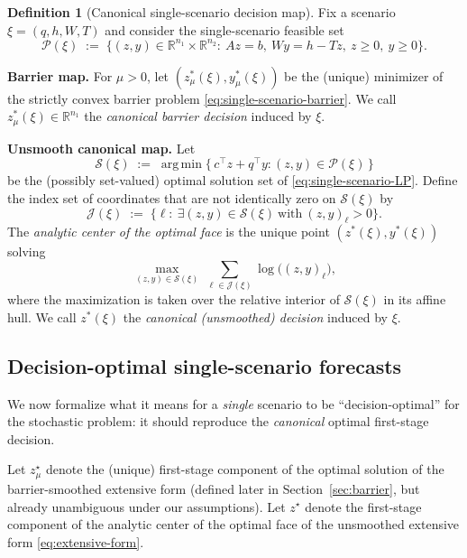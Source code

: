 \documentclass[11pt]{article}
\theoremstyle{plain}
\theoremstyle{definition}
\newtheorem{definition}[theorem]{Definition}
\theoremstyle{remark}
\newcommand{\R}{\mathbb{R}}
\newcommand{\argmin}{\operatorname*{arg\,min}}
\begin{document}
\begin{definition}[Canonical single-scenario decision map]\label{def:canonical-map}
Fix a scenario $\xi=(q,h,W,T)$ and consider the single-scenario feasible set
\[
  \mathcal P(\xi)\;:=\;\big\{(z,y)\in\R^{n_1}\times\R^{n_2}:\ Az=b,\ Wy=h-Tz,\ z\ge 0,\ y\ge 0\big\}.
\]

\smallskip
\noindent\textbf{Barrier map.}
For $\mu>0$, let $(z_\mu^*(\xi),y_\mu^*(\xi))$ be the (unique) minimizer of the strictly convex barrier problem
\eqref{eq:single-scenario-barrier}.  We call $z_\mu^*(\xi)\in\R^{n_1}$ the \emph{canonical barrier decision}
induced by $\xi$.

\smallskip
\noindent\textbf{Unsmooth canonical map.}
Let
\[
  \mathcal S(\xi)\;:=\;\argmin\big\{\, c^\top z + q^\top y : (z,y)\in\mathcal P(\xi)\,\big\}
\]
be the (possibly set-valued) optimal solution set of \eqref{eq:single-scenario-LP}.  Define the index set of
coordinates that are not identically zero on $\mathcal S(\xi)$ by
\[
  \mathcal J(\xi)\;:=\;\Big\{\ell:\ \exists (z,y)\in\mathcal S(\xi)\ \text{with}\ (z,y)_\ell>0\Big\}.
\]
The \emph{analytic center of the optimal face} is the unique point $(z^*(\xi),y^*(\xi))$ solving
\begin{equation}\label{eq:analytic-center-opt-face}
  \max_{(z,y)\in\mathcal S(\xi)}\ \sum_{\ell\in\mathcal J(\xi)} \log\big((z,y)_\ell\big),
\end{equation}
where the maximization is taken over the relative interior of $\mathcal S(\xi)$ in its affine hull.  We call
$z^*(\xi)$ the \emph{canonical (unsmoothed) decision} induced by $\xi$.
\end{definition}

\subsection{Decision-optimal single-scenario forecasts}\label{subsec:dosf}

We now formalize what it means for a \emph{single} scenario to be ``decision-optimal'' for the stochastic
problem: it should reproduce the \emph{canonical} optimal first-stage decision.

Let $z_\mu^\star$ denote the (unique) first-stage component of the optimal solution of the barrier-smoothed
extensive form (defined later in Section~\ref{sec:barrier}, but already unambiguous under our
assumptions).  Let $z^\star$ denote the first-stage component of the analytic center of the optimal face of the
unsmoothed extensive form \eqref{eq:extensive-form}.
\end{document}
